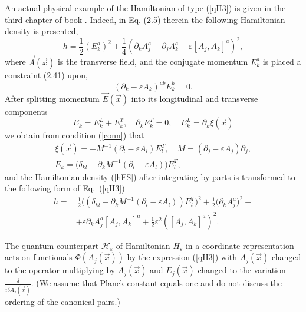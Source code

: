 \documentclass[12pt]{article}
\newcommand{\HH}{\mathscr{H}}
\newcommand{\ve}{\varepsilon}
\begin{document}
	An actual physical example of the Hamiltonian of type
(\ref{qH3})
	is given in the third chapter of book
\cite{FS}.
	Indeed, in Eq.
(2.5)
	therein the following Hamiltonian density is presented,
\begin{equation}
\label{hFS}
    h = \frac{1}{2} (E_{k}^{a})^{2} + \frac{1}{4}
	(\partial_{k}A_{j}^{a} - \partial_{j}A_{k}^{a}
	    - \ve [A_{j},A_{k}]^{a})^{2} ,
\end{equation}
	where
$ \vec{A}(\vec{x}) $ is the transverse field, and
	the conjugate momentum
$ E_{k}^{a} $
	is placed a constraint (2.41) upon,
\begin{equation}
\label{conn}
    (\partial_{k} - \ve A_{k})^{ab} E_{k}^{b} = 0 .
\end{equation}
	After splitting momentum
$ \vec{E}(\vec{x}) $
	into its longitudinal and transverse components
\begin{equation*}
    E_{k} = E_{k}^{L} + E_{k}^{T} ,\quad \partial_{k} E_{k}^{T} = 0,
	\quad E_{k}^{L} = \partial_{k} \xi(\vec{x})
\end{equation*}
	we obtain from condition
(\ref{conn})
	that
\begin{gather*}
    \xi(\vec{x}) = -M^{-1} (\partial_{l} -\ve A_{l}) E_{l}^{T},
    \quad M = (\partial_{j} - \ve A_{j})\partial_{j} , \\
    E_{k} = \bigl(\delta_{kl}
	- \partial_{k} M^{-1} (\partial_{l} -\ve A_{l})\bigr) E_{l}^{T},
\end{gather*}
	and the Hamiltonian density
(\ref{hFS})
	after integrating by parts is transformed to the following
    form of 
Eq.~(\ref{qH3})
\begin{align*}
    h =& \,\frac{1}{2} \bigl( (\delta_{kl}
	- \partial_{k} M^{-1} (\partial_{l} -\ve A_{l}) ) E_{l}^{T} \bigr)^{2}
	+ \frac{1}{2} \bigl( \partial_{k}A_{j}^{a} \bigr)^{2} +\\
	&+ \ve \partial_{k}A_{j}^{a} [A_{j}, A_{k}]^{a}
	+\frac{1}{2} \ve^{2} ([A_{j},A_{k}]^{a})^{2} .
\end{align*}

    The quantum counterpart
$ \HH_{\ve} $ of Hamiltonian
$ H_{\ve} $
    in a coordinate representation
    acts on functionals
$ \Phi(A_{j}(\vec{x})) $
    by the expression
(\ref{qH3})
    with
$ A_{j}(\vec{x}) $
    changed to the operator multiplying by
$ A_{j}(\vec{x}) $
    and
$ E_{j}(\vec{x}) $
    changed to the variation
$ \frac{\delta}{i\delta A_{j}(\vec{x})} $.
    (We assume that Planck constant equals one and do not discuss
    the ordering of the canonical pairs.)
\end{document}
